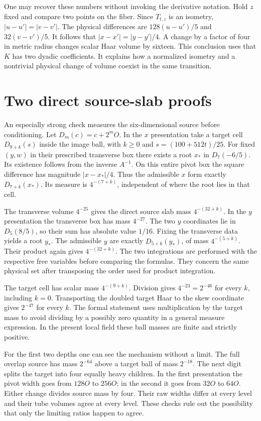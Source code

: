 \documentclass[12pt,letterpaper]{article}
\begin{document}
One may recover these numbers without invoking the derivative notation. Hold $z$ fixed and compare two points on the fiber. Since $T_{t,z}$ is an isometry, $|u-u'|=|v-v'|$. The physical differences are $128(u-u')/5$ and $32(v-v')/5$. It follows that $|x-x'|=|y-y'|/4$. A change by a factor of four in metric radius changes scalar Haar volume by sixteen. This conclusion uses that $K$ has two dyadic coefficients. It explains how a normalized isometry and a nontrivial physical change of volume coexist in the same transition.

\section{Two direct source-slab proofs}
An especially strong check measures the six-dimensional source before conditioning. Let $D_m(c)=c+2^mO$. In the $x$ presentation take a target cell $D_{9+k}(s)$ inside the image ball, with $k\ge0$ and $s=(100+512t)/25$. For fixed $(y,w)$ in their prescribed transverse box there exists a root $x_*$ in $D_7(-6/5)$. Its existence follows from the inverse $A^{-1}$. On this entire pivot box the square difference has magnitude $|x-x_*|/4$. Thus the admissible $x$ form exactly $D_{7+k}(x_*)$. Its measure is $4^{-(7+k)}$, independent of where the root lies in that cell.

The transverse volume $4^{-25}$ gives the direct source slab mass $4^{-(32+k)}$. In the $y$ presentation the transverse box has mass $4^{-27}$. The two $y$ coordinates lie in $D_5(8/5)$, so their sum has absolute value $1/16$. Fixing the transverse data yields a root $y_*$. The admissible $y$ are exactly $D_{5+k}(y_*)$, of mass $4^{-(5+k)}$. Their product again gives $4^{-(32+k)}$. The two integrations are performed with the respective free variables before comparing the formulas. They concern the same physical set after transposing the order used for product integration.

The target cell has scalar mass $4^{-(9+k)}$. Division gives $4^{-23}=2^{-46}$ for every $k$, including $k=0$. Transporting the doubled target Haar to the skew coordinate gives $2^{-47}$ for every $k$. The formal statement uses multiplication by the target mass to avoid dividing by a possibly zero quantity in a general measure expression. In the present local field these ball masses are finite and strictly positive.

For the first two depths one can see the mechanism without a limit. The full overlap source has mass $2^{-64}$ above a target ball of mass $2^{-18}$. The next digit splits the target into four equally heavy children. In the first presentation the pivot width goes from $128O$ to $256O$; in the second it goes from $32O$ to $64O$. Either change divides source mass by four. Their raw widths differ at every level and their tube volumes agree at every level. These checks rule out the possibility that only the limiting ratios happen to agree.
\end{document}
